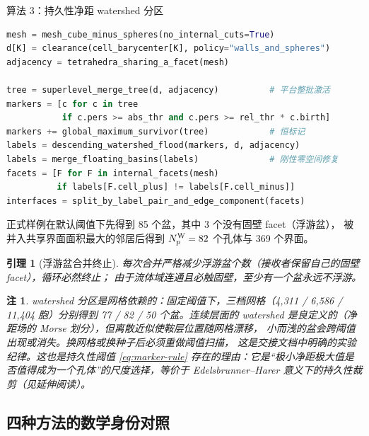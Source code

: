 \documentclass[UTF8,zihao=-4]{ctexart}
\newtheorem{lemma}[definition]{引理}
\newtheorem{remark}[definition]{注}
\begin{document}
\begin{algobox}{算法 3：持久性净距 watershed 分区}
\begin{lstlisting}[style=compactcode,language=Python]
mesh = mesh_cube_minus_spheres(no_internal_cuts=True)
d[K] = clearance(cell_barycenter[K], policy="walls_and_spheres")
adjacency = tetrahedra_sharing_a_facet(mesh)

tree = superlevel_merge_tree(d, adjacency)          # 平台整批激活
markers = [c for c in tree
           if c.pers >= abs_thr and c.pers >= rel_thr * c.birth]
markers += global_maximum_survivor(tree)            # 恒标记
labels = descending_watershed_flood(markers, d, adjacency)
labels = merge_floating_basins(labels)              # 刚性零空间修复
facets = [F for F in internal_facets(mesh)
          if labels[F.cell_plus] != labels[F.cell_minus]]
interfaces = split_by_label_pair_and_edge_component(facets)
\end{lstlisting}
\end{algobox}

正式样例在默认阈值下先得到 85 个盆，其中 3 个没有固壁 facet（浮游盆），
被并入共享界面面积最大的邻居后得到 $N_p^{\rm W}=82$ 个孔体与 369 个界面。

\begin{lemma}[浮游盆合并终止]
  每次合并严格减少浮游盆个数（接收者保留自己的固壁 facet），循环必然终止；
  由于流体域连通且必触固壁，至少有一个盆永远不浮游。
\end{lemma}

\begin{remark}
  watershed 分区是\emph{网格依赖}的：固定阈值下，三档网格（4{,}311 /
  6{,}586 / 11{,}404 胞）分别得到 77 / 82 / 50 个盆。连续层面的 watershed
  是良定义的（净距场的 Morse 划分），但离散近似使鞍层位置随网格漂移，
  小而浅的盆会跨阈值出现或消失。换网格或换种子后\emph{必须重做阈值扫描}，
  这是交接文档中明确的实验纪律。这也是持久性阈值 \eqref{eq:marker-rule}
  存在的理由：它是``极小净距极大值是否值得成为一个孔体''的尺度选择，等价于
  Edelsbrunner--Harer 意义下的持久性裁剪（见延伸阅读）。
\end{remark}

\subsection{四种方法的数学身份对照}
\end{document}
